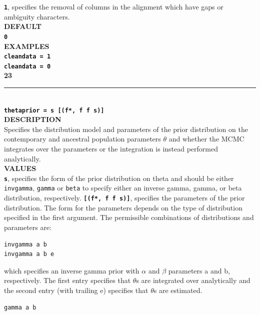\documentclass{book}
\numberwithin{equation}{section} \renewcommand{\baselinestretch}{0.55}
\begin{document}
\textbf{\texttt{1}}, specifies the removal of columns in the alignment
which have gaps or ambiguity
characters. \vspace{5pt}\\
\textbf{DEFAULT} \vspace{5pt}\\
\textbf{\texttt{0}} \vspace{5pt}\\
\textbf{EXAMPLES} \vspace{5pt}\\
\textbf{\texttt{cleandata = 1}} \vspace{5pt}\\
\textbf{\texttt{cleandata = 0}}\vspace{10pt}\\
\textbf{{\large 23}} \\
\noindent\rule{\textwidth}{0.8pt} \\
\textbf{{\Large \texttt{thetaprior =  s [(f*, f f s)] }}} \vspace{5pt}\\
\textbf{DESCRIPTION} \vspace{5pt}\\
Specifies the distribution model and parameters of the prior
distribution on the contemporary and ancestral population parameters
$\theta$ and whether the MCMC integrates over the parameters or the
integration is instead performed analytically.
\vspace{5pt}\\
\textbf{VALUES} \vspace{5pt}\\
\textbf{\texttt{s}}, specifies the form of the prior distribution
on theta and should be either \texttt{invgamma}, \texttt{gamma} or
\texttt{beta} to specify either an inverse gamma, gamma, or beta
distribution, respectively.
\textbf{\texttt{[(f*, f f s)]}}, specifies the parameters of the prior
distribution. The form for the parameters depends on the type of distribution specified
in the first argument. The permissible combinations of distributions and parameters
are:
\begin{verbatim}
invgamma a b
invgamma a b e
\end{verbatim}
which specifies an inverse gamma prior with $\alpha$ and $\beta$ parameters a and b, respectively. The first entry specifies
that $\theta$s are integrated over analytically and the second entry (with trailing e) specifies that $\theta$s are estimated.
\begin{verbatim}
gamma a b
\end{verbatim}
\end{document}
